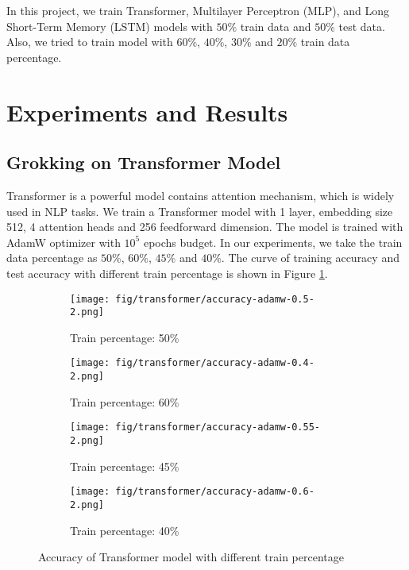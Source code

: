 \documentclass{article}
\begin{document}
    In this project, we train Transformer, Multilayer Perceptron (MLP), and Long Short-Term Memory (LSTM) models with $50\%$ train data and $50\%$ test data. Also, we tried to train model with $60\%$, $40\%$, $30\%$ and $20\%$ train data percentage.


    \section{Experiments and Results}

    \subsection{Grokking on Transformer Model}

    Transformer is a powerful model contains attention mechanism, which is widely used in NLP tasks. We train a Transformer model with 1 layer, embedding size 512, 4 attention heads and 256 feedforward dimension. The model is trained with AdamW optimizer with $10^5$ epochs budget. In our experiments, we take the train data percentage as $50\%$, $60\%$, $45\%$ and $40\%$. The curve of training accuracy and test accuracy with different train percentage is shown in Figure \ref{fig:transformer-accuracy}.

    \begin{figure}[ht]
        \centering
        \begin{subfigure}{0.45\textwidth}
            \texttt{[image: fig/transformer/accuracy-adamw-0.5-2.png]}
            \caption{Train percentage: 50\%}
        \end{subfigure}
        \begin{subfigure}{0.45\textwidth}
            \texttt{[image: fig/transformer/accuracy-adamw-0.4-2.png]}
            \caption{Train percentage: 60\%}
        \end{subfigure}
        \begin{subfigure}{0.45\textwidth}
            \texttt{[image: fig/transformer/accuracy-adamw-0.55-2.png]}
            \caption{Train percentage: 45\%}
        \end{subfigure}
        \begin{subfigure}{0.45\textwidth}
            \texttt{[image: fig/transformer/accuracy-adamw-0.6-2.png]}
            \caption{Train percentage: 40\%}
        \end{subfigure}
        \caption{Accuracy of Transformer model with different train percentage}
        \label{fig:transformer-accuracy}
    \end{figure}
\end{document}
